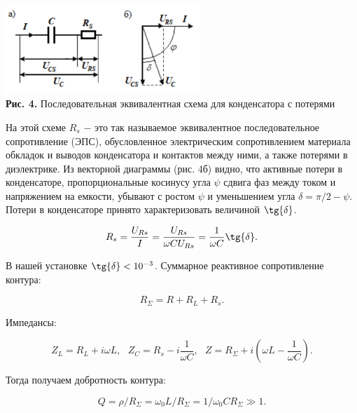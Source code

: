 \documentclass[a4paper,12pt]{article} %
\begin{document}
\begin{center}
\includegraphics[width=0.55\textwidth]{3.2.2_4.png}\\
\textbf{Рис. 4.}  Последовательная эквивалентная схема для конденсатора с потерями\\ 
\end{center}

\hfill \break На этой схеме $R_{s}$ $-$ это так называемое эквивалентное последовательное сопротивление (ЭПС), обусловленное электрическим сопротивлением материала обкладок и выводов конденсатора и контактов между ними, а также потерями в диэлектрике. Из векторной диаграммы (рис. 4б) видно, что активные потери в конденсаторе, пропорциональные косинусу угла $\psi$ сдвига фаз между током и напряжением на емкости, убывают с ростом $\psi$ и уменьшением угла $\delta = \pi/2 - \psi$. Потери в конденсаторе принято характеризовать величиной $\tg{\delta}$. 

\begin{equation}\label{ linkname }
R_{s} = \frac{U_{Rs}}{I} = \frac{U_{Rs}}{\omega CU_{Rs}} = \frac{1}{\omega C} \tg{\delta}.
\end{equation}

\hfill \break В нашей установке $\tg{\delta} < 10^{-3}$. Суммарное реактивное сопротивление контура:

\begin{equation}\label{ linkname }
R_{\Sigma} = R + R_{L} + R_{s}.
\end{equation}

\hfill \break Импедансы:

\begin{equation}\label{ linkname }
Z_{L} = R_{L} + i\omega L, \text{ } Z_{C} = R_{s} - i\frac{1}{\omega C}, \text{ } Z = R_{\Sigma} + i\left( \omega L - \frac{1}{\omega C} \right).
\end{equation}

\hfill \break Тогда получаем добротность контура:

\begin{equation}\label{ linkname }
Q = \rho/R_{\Sigma} = \omega_{0}L/R_{\Sigma} = 1/\omega_{0}CR_{\Sigma} \gg 1.
\end{equation}
\end{document}
